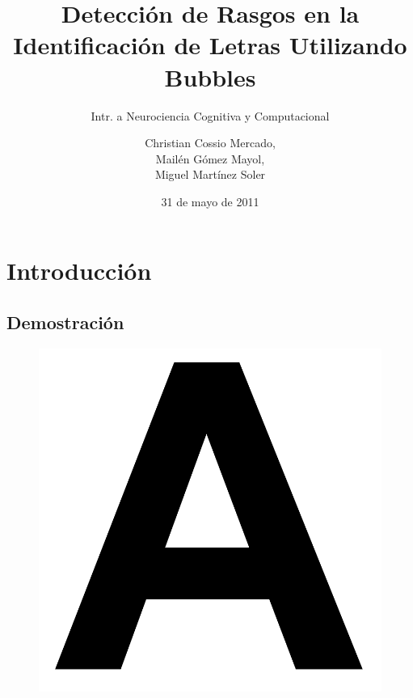 \documentclass{beamer}
\title[Identificaci\'on de Letras Utilizando Bubbles]{Detecci\'on de Rasgos en la Identificaci\'on de Letras Utilizando Bubbles}
\subtitle{Intr. a Neurociencia Cognitiva y Computacional}
\author[Mart\'inez Soler,\\G\'omez Mayol,\\Cossio Mercado]{Christian Cossio Mercado,\\Mail\'en G\'omez Mayol,\\Miguel Mart\'inez Soler}
\institute{Departamento de Computaci\'on - FCEyN, UBA}
\date{31 de mayo de 2011}
\begin{document}
\begin{frame}
\titlepage
\end{frame}

\section{Introducci\'on}
  \subsection{Demostraci\'on}

      \begin{frame}
      \begin{figure}
	\includegraphics[scale=.2]{graficos/letra.png}
      \end{figure}
      \end{frame}

\end{document}
